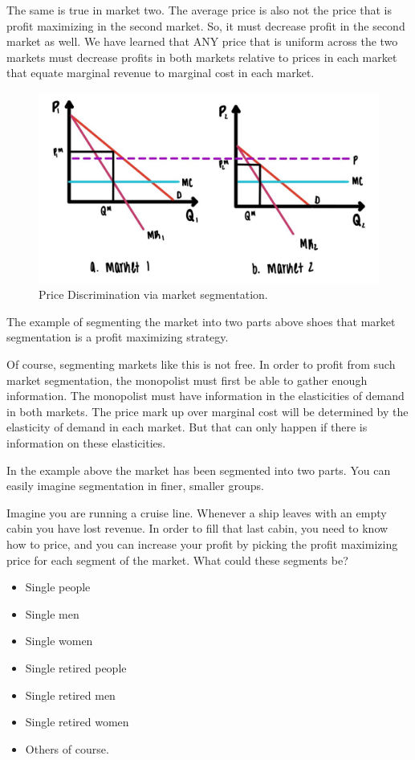 \documentclass[
]{book}
\providecommand{\tightlist}{%
  \setlength{\itemsep}{0pt}\setlength{\parskip}{0pt}}
\begin{document}
The same is true in market two. The average price is also not the price that is profit maximizing in the second market. So, it must decrease profit in the second market as well.
We have learned that ANY price that is uniform across the two markets must decrease profits in both markets relative to prices in each market that equate marginal revenue to marginal cost in each market.

\begin{figure}

{\centering \includegraphics[width=0.5\linewidth]{img/monopoly/fig7} 

}

\caption{Price Discrimination via market segmentation.}\label{fig:monopoly07}
\end{figure}

The example of segmenting the market into two parts above shoes that market segmentation is a profit maximizing strategy.

Of course, segmenting markets like this is not free. In order to profit from such market segmentation, the monopolist must first be able to gather enough information. The monopolist must have information in the elasticities of demand in both markets. The price mark up over marginal cost will be determined by the elasticity of demand in each market. But that can only happen if there is information on these elasticities.

In the example above the market has been segmented into two parts. You can easily imagine segmentation in finer, smaller groups.

Imagine you are running a cruise line. Whenever a ship leaves with an empty cabin you have lost revenue. In order to fill that last cabin, you need to know how to price, and you can increase your profit by picking the profit maximizing price for each segment of the market. What could these segments be?

\begin{itemize}
\tightlist
\item
  Single people
\item
  Single men
\item
  Single women
\item
  Single retired people
\item
  Single retired men
\item
  Single retired women
\item
  Others of course.
\end{itemize}
\end{document}
